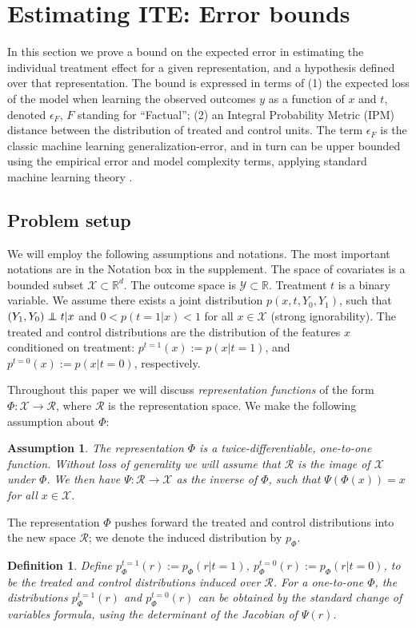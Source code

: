 \documentclass{article}
\newtheorem{thmdef}{Definition}
\newtheorem{thmasmp}{Assumption}
\def\cX{\mathcal X}
\def\cY{\mathcal Y}
\def\cR{\mathcal{R}}
\def \R{\mathbb{R}}
\newcommand\indep{\protect\mathpalette{\protect\independenT}{\perp}}
\def\independenT#1#2{\mathrel{\rlap{$#1#2$}\mkern2mu{#1#2}}}
\newcommand{\pc}{p^{t=0}}
\newcommand{\pt}{p^{t=1}}
\begin{document}
\section{Estimating ITE: Error bounds}\label{sec:theory}

In this section we prove a bound on the expected error in estimating the individual treatment effect for a given representation, and a hypothesis defined over that representation.
The bound is expressed in terms of (1) the expected loss of the model when learning the observed outcomes $y$ as a function of $x$ and $t$, denoted $\epsilon_F$, $F$ standing for ``Factual''; (2) an Integral Probability Metric (IPM) distance between the distribution of treated and control units. The term $\epsilon_F$ is the classic machine learning generalization-error, and in turn can be upper bounded using the empirical error and model complexity terms, applying standard machine learning theory \citep{shalev2014understanding}.

\subsection{Problem setup}
We will employ the following assumptions and notations. The most important notations are in the Notation box in the supplement.
The space of covariates is a bounded subset $\cX \subset \R^d$. The outcome space is $\cY\subset \R$. Treatment $t$ is a binary variable. We assume there exists a joint distribution $p(x,t,Y_0,Y_1)$, such that $(Y_1,Y_0) \indep t |x$ and $0<p(t=1|x)<1$ for all $x\in \cX$ (strong ignorability).
The treated and control distributions are the distribution of the features $x$ conditioned on treatment: $\pt(x) := p(x|t=1)$, and $\pc(x) := p(x|t=0)$, respectively.







Throughout this paper we will discuss \emph{representation functions} of the form
 $\Phi : \cX \rightarrow \cR$, where $\cR$ is the representation space. We make the following assumption about $\Phi$:
\begin{thmasmp}\label{asmp:inv}
The representation $\Phi$ is a twice-differentiable, one-to-one function. Without loss of generality we will assume that $\cR$ is the image of $\cX$ under $\Phi$. We then have $\Psi :\cR \rightarrow \cX$ as the inverse of $\Phi$, such that $\Psi(\Phi(x)) = x$ for all $x \in \cX$.
\end{thmasmp}
The representation $\Phi$ pushes forward the treated and control distributions into the new space $\cR$; we denote the induced distribution by $p_\Phi$.
\begin{thmdef}\label{def:phit}
Define $\pt_\Phi(r) := p_\Phi(r|t=1)$, $\pc_\Phi(r) := p_\Phi(r|t=0)$, to be the treated and control distributions induced over $\cR$.
For a one-to-one $\Phi$, the distributions $\pt_\Phi(r)$ and $\pc_\Phi(r)$ can be obtained by the standard change of variables formula, using the determinant of the Jacobian of $\Psi(r)$.
\end{thmdef} 
\end{document}
